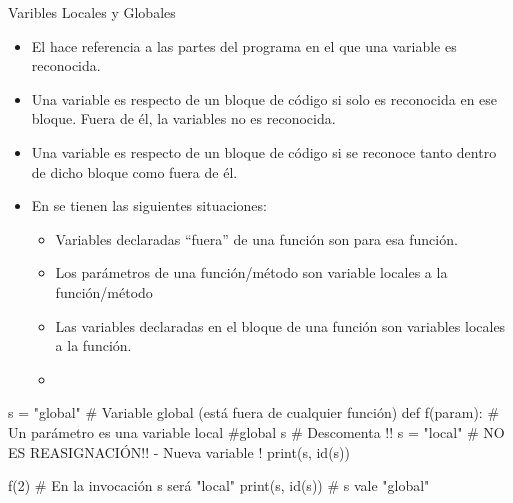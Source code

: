 \documentclass[10pt,envcountsect,spanish]{beamer}
\begin{document}
\begin{frame}[fragile,label={varLocalGlobal}]{Varibles Locales y Globales}
\begin{itemize} \setlength\itemsep{0em}
\item El  hace referencia a las partes del programa en el que una variable es reconocida.
\item Una variable es  respecto de un bloque de código si solo es reconocida en ese bloque. Fuera de él, la variables no es reconocida. 

\item Una variable es  respecto de un bloque de código si se reconoce tanto dentro de dicho bloque como fuera de él.


\item En  se tienen las siguientes situaciones:

\begin{itemize}
\item Variables declaradas ``fuera'' de una función son  para esa función.

\item Los parámetros de una función/método son variable locales a la función/método

\item Las variables declaradas en el bloque de una función son variables locales a la función.

\item {}
\end{itemize}
\end{itemize}

\footnotesize
\begin{pyconsole}[][frame=single]
s = "global"          # Variable global (está fuera de cualquier función)
def f(param):         # Un parámetro es una variable local
    #global s         # Descomenta !!
    s = "local"       # NO ES REASIGNACIÓN!! - Nueva variable !
    print(s, id(s))
    
f(2)                  # En la invocación s será "local"
print(s, id(s))       # s vale "global"
\end{pyconsole}


\end{frame}

\end{document}
